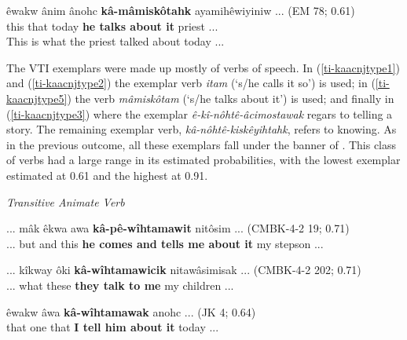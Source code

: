     
    \begin{exe}
    \ex
    \gll êwakw ânim ânohc \textbf{kâ-mâmiskôtahk} ayamihêwiyiniw ... \tiny{(EM 78; 0.61)}\\
    this that today {\textbf{he talks about it}} {priest} ...\\
    \trans This is what the priest talked about today ... \tiny{\citep[52-53]{Minde1997kwayask}}
    \label{ti-kaacnjtype5}
    \end{exe}

The VTI exemplars were made up mostly of verbs of speech. In (\ref{ti-kaacnjtype1}) and (\ref{ti-kaacnjtype2}) the exemplar verb \textit{itam} (`s/he calls it so') is used; in (\ref{ti-kaacnjtype5}) the verb \textit{mâmiskôtam} (`s/he talks about it') is used; and finally in (\ref{ti-kaacnjtype3}) where the exemplar \textit{ê-kî-nôhtê-âcimostawak} regars to telling a story. The remaining exemplar verb, \textit{kâ-nôhtê-kiskêyihtahk}, refers to knowing. As in the previous outcome, all these exemplars fall under the banner of . This class of verbs had a large range in its estimated probabilities, with the lowest exemplar estimated at 0.61 and the highest at 0.91.
    
\vspace{5mm}
\textit{Transitive Animate Verb}

    \begin{exe}
    \ex
    \gll ... mâk êkwa awa \textbf{kâ-pê-wîhtamawit} nitôsim ... \tiny{(CMBK-4-2 19; 0.71)}\\
    ... but and this {\textbf{he comes and tells me about it}} my stepson ...\\
    \trans  
    \label{ta-kaacnjtype1}
    \end{exe}
    
    \begin{exe}
    \ex
    \gll ... kîkway ôki \textbf{kâ-wîhtamawicik} nitawâsimisak ... \tiny{(CMBK-4-2 202; 0.71)} \\
    ... what these {\textbf{they talk to me}} {my children} ... \\
    \trans  
    \label{ta-kaacnjtype2}
    \end{exe}
    
    
    \begin{exe}
    \ex
    \gll êwakw âwa \textbf{kâ-wîhtamawak} anohc ... \tiny{(JK 4; 0.64)}\\
    that one that {\textbf{I tell him about it}} today ... \\
    \trans  
    \label{ta-kaacnjtype3}
    \end{exe}
    

